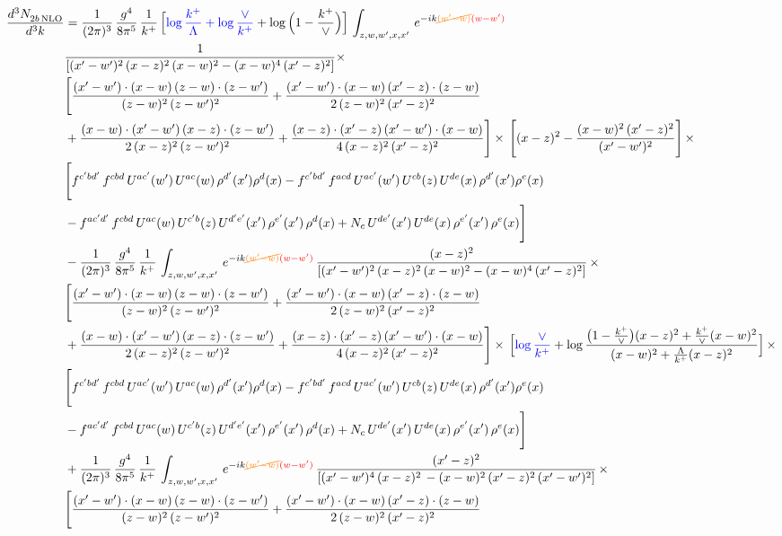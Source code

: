 \documentclass[9pt]{article}
\numberwithin{equation}{section}
\begin{document}
\begin{align} 
    \frac{d^{3}N_{2b\,\rm NLO}^{\rm}}{d^{3}k}  & = \frac{1}{(2\pi)^{3}}\, \frac{g^{4}}{8\pi^{5}}\,\frac{1}{k^{+}}\,\Big[{\color{blue}\log\frac{k^{+}}{\Lambda}+\log\frac{\vee}{k^{+}}}+\log\Big(1-\frac{k^{+}}{\vee}\Big)\Big]\,\int_{z,w,w^{\prime},x,x'}\, e^{-ik{\color{orange}\cancel{(w^{\prime}-w)}}{\color{red}(w-w^{\prime})}}\,\notag \\ & \frac{1}{\left[(x'-w')^{2}\,(x-z)^{2}\,(x-w)^{2} - (x-w)^{4}\, (x'-z)^{2}\right]} \times\notag \\ & \Bigg[\frac{(x'-w')\cdot (x-w)\, (z-w)\cdot (z-w')}{(z-w)^{2}\, (z-w')^{2}}+\frac{(x'-w')\cdot (x-w)\, (x'-z)\cdot (z-w)}{2\, (z-w)^{2}\, (x'-z)^{2}}\notag \\ & +\frac{(x-w)\cdot (x'-w')\, (x-z)\cdot (z-w')}{2\, (x-z)^{2}\, (z-w')^{2}}+\frac{(x-z)\cdot (x'-z)\, (x'-w')\cdot (x-w)}{4\, (x-z)^{2}\, (x'-z)^{2}}\Bigg] \times\,\Bigg[(x-z)^{2} - \frac{(x-w)^{2}\, (x'-z)^{2}}{(x'-w')^{2}}\Bigg]\,\times \notag \\ & \Bigg[f^{c'bd'}\,f^{cbd}\, U^{ac'}(w')\,U^{ac}(w)\,\rho^{d'}(x')\rho^{d}(x)- f^{c'bd'}\,f^{acd}\,U^{ac'}(w')\,U^{cb}(z)\,U^{de}(x)\,\rho^{d'}(x')\rho^{e}(x) \notag \\ & -f^{ac'd'}\,f^{cbd}\,U^{ac}(w)\,U^{c'b}(z)\,U^{d'e'}(x')\,\rho^{e'}(x')\,\rho^{d}(x) +N_{c}\,U^{de'}(x')\,U^{de}(x)\,\rho^{e'}(x')\,\rho^{e}(x)\Bigg]\notag \\ &  - \frac{1}{(2\pi)^{3}}\, \frac{g^{4}}{8\pi^{5}}\,\frac{1}{k^{+}}\,\int_{z,w,w^{\prime},x,x'}\, e^{-ik{\color{orange}\cancel{(w^{\prime}-w)}}{\color{red}(w-w^{\prime})}}\, \frac{(x-z)^{2}}{\left[(x'-w')^{2}\,(x-z)^{2}\,(x-w)^{2} - (x-w)^{4}\, (x'-z)^{2}\right]}\,  \times\notag \\ & \Bigg[\frac{(x'-w')\cdot (x-w)\, (z-w)\cdot (z-w')}{(z-w)^{2}\, (z-w')^{2}}+\frac{(x'-w')\cdot (x-w)\, (x'-z)\cdot (z-w)}{2\, (z-w)^{2}\, (x'-z)^{2}}\notag \\ & +\frac{(x-w)\cdot (x'-w')\, (x-z)\cdot (z-w')}{2\, (x-z)^{2}\, (z-w')^{2}}+\frac{(x-z)\cdot (x'-z)\, (x'-w')\cdot (x-w)}{4\, (x-z)^{2}\, (x'-z)^{2}}\Bigg] \times\,\Big[{\color{blue}\log\frac{\vee}{k^{+}}}+\log\frac{\big(1-\frac{k^{+}}{\vee}\big)(x-z)^{2}+\frac{k^{+}}{\vee}(x-w)^{2}}{(x-w)^{2}+\frac{\Lambda}{k^{+}}(x-z)^{2}}\Big]\,\times \notag \\ & \Bigg[f^{c'bd'}\,f^{cbd}\, U^{ac'}(w')\,U^{ac}(w)\,\rho^{d'}(x')\rho^{d}(x)- f^{c'bd'}\,f^{acd}\,U^{ac'}(w')\,U^{cb}(z)\,U^{de}(x)\,\rho^{d'}(x')\rho^{e}(x) \notag \\ & -f^{ac'd'}\,f^{cbd}\,U^{ac}(w)\,U^{c'b}(z)\,U^{d'e'}(x')\,\rho^{e'}(x')\,\rho^{d}(x) +N_{c}\,U^{de'}(x')\,U^{de}(x)\,\rho^{e'}(x')\,\rho^{e}(x)\Bigg]\notag \\ &  + \frac{1}{(2\pi)^{3}}\, \frac{g^{4}}{8\pi^{5}}\,\frac{1}{k^{+}}\,\int_{z,w,w^{\prime},x,x'}\, e^{-ik{\color{orange}\cancel{(w^{\prime}-w)}}{\color{red}(w-w^{\prime})}}\, \frac{(x'-z)^{2}}{\left[(x'-w')^{4}\,(x-z)^{2}\, - (x-w)^{2}\, (x'-z)^{2}\,(x'-w')^{2}\right]}\,  \times\notag \\ & \Bigg[\frac{(x'-w')\cdot (x-w)\, (z-w)\cdot (z-w')}{(z-w)^{2}\, (z-w')^{2}}+\frac{(x'-w')\cdot (x-w)\, (x'-z)\cdot (z-w)}{2\, (z-w)^{2}\, (x'-z)^{2}}\notag \\ 
\end{align}
\end{document}

